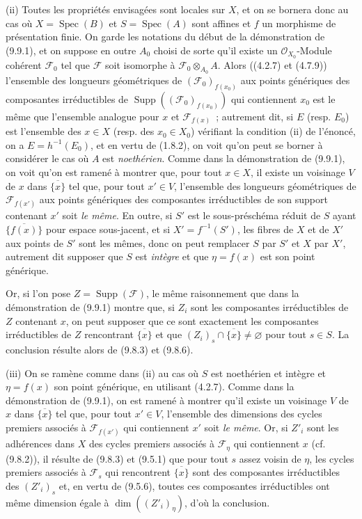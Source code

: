 (ii) Toutes les propriétés envisagées sont locales sur $X$, et on se bornera
donc au cas où $X=\operatorname{Spec}(B)$ et $S=\operatorname{Spec}(A)$ sont
affines et $f$ un morphisme de présentation finie. On garde les notations du
début de la démonstration de (9.9.1), et on suppose en outre $A_0$ choisi de
sorte qu'il existe un $\mathcal O_{X_0}$-Module cohérent $\mathcal F_0$ tel que
$\mathcal F$ soit isomorphe à $\mathcal F_0\otimes_{A_0}A$. Alors ((4.2.7) et
(4.7.9)) l'ensemble des longueurs géométriques de
$(\mathcal F_0)_{f(x_0)}$ aux points génériques des composantes irréductibles de
$\operatorname{Supp}((\mathcal F_0)_{f(x_0)})$ qui contiennent $x_0$ est le
même que l'ensemble analogue pour $x$ et $\mathcal F_{f(x)}$~; autrement dit,
si $E$ (resp. $E_0$) est l'ensemble des $x\in X$ (resp. des $x_0\in X_0$)
vérifiant la condition (ii) de l'énoncé, on a $E=h^{-1}(E_0)$, et en vertu de
(1.8.2), on voit qu'on peut se borner à considérer le cas où $A$ est
\emph{noethérien}. Comme dans la démonstration de (9.9.1), on voit qu'on est
ramené à montrer que, pour tout $x\in X$, il existe un voisinage $V$ de $x$
dans $\overline{\{x\}}$ tel que, pour tout $x'\in V$, l'ensemble des longueurs
géométriques de $\mathcal F_{f(x')}$ aux points génériques des composantes
irréductibles de son support contenant $x'$ soit \emph{le même}. En outre, si
$S'$ est le sous-préschéma réduit de $S$ ayant $\overline{\{f(x)\}}$ pour espace
sous-jacent, et si $X'=f^{-1}(S')$, les fibres de $X$ et de $X'$ aux points de
$S'$ sont les mêmes,
donc on peut remplacer $S$ par $S'$ et $X$ par $X'$, autrement dit supposer que
$S$ est \emph{intègre} et que $\eta=f(x)$ est son point générique.

Or, si l'on pose $Z=\operatorname{Supp}(\mathcal F)$, le même raisonnement que
dans la démonstration de (9.9.1) montre que, si $Z_i$ sont les composantes
irréductibles de $Z$ contenant $x$, on peut supposer que ce sont exactement les
composantes irréductibles de $Z$ rencontrant $\overline{\{x\}}$ et que
$(Z_i)_s\cap\overline{\{x\}}\neq\varnothing$ pour tout $s\in S$. La conclusion
résulte alors de (9.8.3) et (9.8.6).

(iii) On se ramène comme dans (ii) au cas où $S$ est noethérien et intègre et
$\eta=f(x)$ son point générique, en utilisant (4.2.7). Comme dans la
démonstration de (9.9.1), on est ramené à montrer qu'il existe un voisinage $V$
de $x$ dans $\overline{\{x\}}$ tel que, pour tout $x'\in V$, l'ensemble des
dimensions des cycles premiers associés à $\mathcal F_{f(x')}$ qui contiennent
$x'$ soit \emph{le même}. Or, si $Z'_i$ sont les adhérences dans $X$ des cycles
premiers associés à $\mathcal F_\eta$ qui contiennent $x$ (cf. (9.8.2)), il
résulte de (9.8.3) et (9.5.1) que pour tout $s$ assez voisin de $\eta$, les
cycles premiers associés à $\mathcal F_s$ qui rencontrent
$\overline{\{x\}}$ sont des composantes irréductibles des $(Z'_i)_s$ et, en
vertu de (9.5.6), toutes ces composantes irréductibles ont même dimension égale
à $\dim((Z'_i)_\eta)$, d'où la conclusion.

